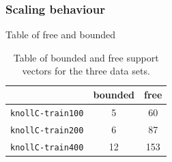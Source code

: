 \documentclass{article}
\begin{document}
\subsubsection{Scaling behaviour}

Table of free and bounded 

\begin{table}[h!]
  \centering
  \begin{tabular}{l | c | c}
    \hfill & bounded & free\\\hline
    \texttt{knollC-train100} & 5 & 60 \\
    \texttt{knollC-train200} & 6 & 87 \\
    \texttt{knollC-train400} & 12 & 153 \\
  \end{tabular}
  \caption{Table of bounded and free support vectors for the three data sets.}
  \label{tab:knoll_free_bounded_SV}
\end{table}
\end{document}
